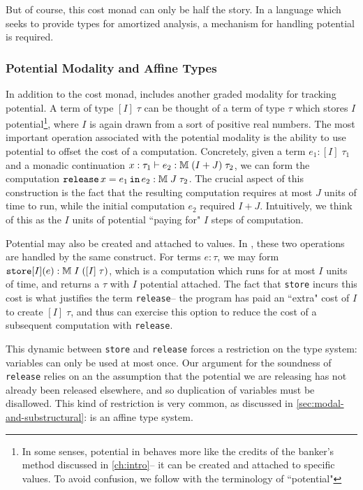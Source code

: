 But of course, this cost monad can only be half the story. In a language which seeks to provide types for amortized analysis, a mechanism for handling potential is required.
 
\subsubsection{Potential Modality and Affine Types}
In addition to the cost monad, \lambdaamor includes another graded modality for tracking potential. A term of type $[I] \; \tau$ can be thought of a term of type $\tau$ which stores $I$ potential\footnote{
In some senses, potential in \lambdaamor behaves more like the credits of the banker's method discussed in \autoref{ch:intro}-- it can be created and attached to specific values. To avoid confusion, we follow \citet{rajani-et-al:popl21} with the terminology of ``potential"
}, where $I$ is again drawn from a sort of positive real numbers.
The most important operation associated with the potential modality is the ability to use potential to offset the cost of a computation. Concretely, given a term $e_1 : [I] \; \tau_1$ and a monadic continuation $x : \tau_1 \vdash e_2 : \mathbb{M} \; (I + J) \; \tau_2$, we can form the computation $\texttt{release}\, x = e_1 \, \texttt{in}\, e_2 : \mathbb{M} \; J \; \tau_2$. The crucial aspect of this construction is the fact that the resulting computation requires at most $J$ units of time to run, while the initial computation $e_2$ required $I + J$. Intuitively, we think of this as the $I$ units of potential ``paying for" $I$ steps of computation. 

Potential may also be created and attached to values. In \lambdaamor, these two operations are handled by the same construct. For terms $e : \tau$, we may form $\texttt{store}[I](e) : \mathbb{M} \; I \; ([I] \; \tau)$, which is a computation which runs for at most $I$ units of time, and returns a $\tau$ with $I$ potential attached. The fact that \texttt{store} incurs this cost is what justifies the term \texttt{release}-- the program has paid an ``extra" cost of $I$ to create $[I] \; \tau$, and thus can exercise this option to reduce the cost of a subsequent computation with \texttt{release}.

This dynamic between \texttt{store} and \texttt{release} forces a restriction on the type system: variables can only be used at most once. Our argument for the soundness of \texttt{release} relies on an the assumption that the potential we are releasing has not already been released elsewhere, and so duplication of variables must be disallowed. This kind of restriction is very common, as discussed in \autoref{sec:modal-and-substructural}: \lambdaamor is an affine type system.



